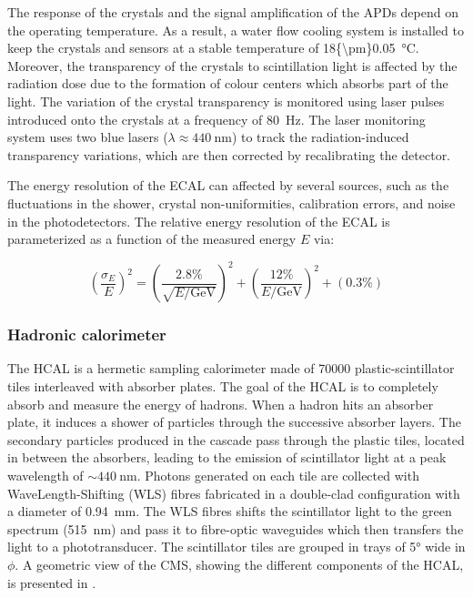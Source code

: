 The response of the crystals and the signal amplification of the APDs depend on the operating temperature. As a result, a water flow cooling system is installed to keep the crystals and sensors at a stable  temperature of \SI{18{\pm}0.05}{\celsius}. Moreover, the transparency of the crystals to scintillation light is affected by the radiation dose due to the formation of colour centers which absorbs part of the light. The variation of the crystal transparency is monitored using laser pulses introduced onto the crystals at a frequency of \SI{80}{\Hz}. The laser monitoring system uses two blue lasers ($\lambda\approx\SI{440}{\nm}$) to track the radiation-induced transparency variations, which are then corrected by recalibrating the detector.

The energy resolution of the ECAL can affected by several sources, such as the fluctuations in the shower, crystal non-uniformities, calibration errors, and noise in the photodetectors. The relative energy resolution of the ECAL is parameterized as a function of the measured energy $E$ via:

\begin{equation}
  \left(\frac{\sigma_{E}}{E}\right)^{2} = \left(\frac{2.8\%}{\sqrt{E/\mathrm{GeV}}}\right)^{2} + \left(\frac{12\%}{E/\mathrm{GeV}}\right)^{2} + \left(0.3\%\right)
\end{equation}


\subsubsection{Hadronic calorimeter}

The HCAL is a hermetic sampling calorimeter made of 70000 plastic-scintillator tiles interleaved with absorber plates. The goal of the HCAL is to completely absorb and measure the energy of hadrons. When a hadron hits an absorber plate, it induces a shower of particles through the successive absorber layers. The secondary particles produced in the cascade pass through the plastic tiles, located in between the absorbers, leading to the emission of scintillator light at a peak wavelength of $\sim\SI{440}{\nm}$. Photons generated on each tile are collected with WaveLength-Shifting (WLS) fibres fabricated in a double-clad configuration with a diameter of \SI{0.94}{\mm}. The WLS fibres shifts the scintillator light to the green spectrum (\SI{515}{\nm}) and pass it to fibre-optic waveguides which then transfers the light to a phototransducer. The scintillator tiles are grouped in trays of \ang{5} wide in $\phi$. A geometric view of the CMS, showing the different components of the HCAL, is presented in .

